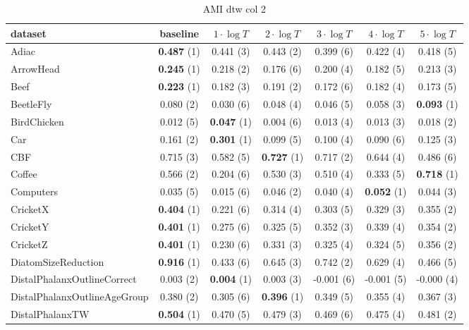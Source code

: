     \begin{table}[ht]
    \caption{AMI dtw col 2} 
    \begin{adjustbox}{width=\textwidth}
    \begin{tabular}{lcccccc}
    \hline
    dataset & baseline & \textbf{$1\cdot \log{T}$} & \textbf{$2\cdot \log{T}$} & \textbf{$3\cdot \log{T}$} & \textbf{$4\cdot \log{T}$} & \textbf{$5\cdot \log{T}$} \\ \hline
    Adiac & \textbf{0.487} (1) & 0.441 (3) & 0.443 (2) & 0.399 (6) & 0.422 (4) & 0.418 (5) \\
    ArrowHead & \textbf{0.245} (1) & 0.218 (2) & 0.176 (6) & 0.200 (4) & 0.182 (5) & 0.213 (3) \\
    Beef & \textbf{0.223} (1) & 0.182 (3) & 0.191 (2) & 0.172 (6) & 0.182 (4) & 0.173 (5) \\
    BeetleFly & 0.080 (2) & 0.030 (6) & 0.048 (4) & 0.046 (5) & 0.058 (3) & \textbf{0.093} (1) \\
    BirdChicken & 0.012 (5) & \textbf{0.047} (1) & 0.004 (6) & 0.013 (4) & 0.013 (3) & 0.018 (2) \\
    Car & 0.161 (2) & \textbf{0.301} (1) & 0.099 (5) & 0.100 (4) & 0.090 (6) & 0.125 (3) \\
    CBF & 0.715 (3) & 0.582 (5) & \textbf{0.727} (1) & 0.717 (2) & 0.644 (4) & 0.486 (6) \\
    Coffee & 0.566 (2) & 0.204 (6) & 0.530 (3) & 0.510 (4) & 0.333 (5) & \textbf{0.718} (1) \\
    Computers & 0.035 (5) & 0.015 (6) & 0.046 (2) & 0.040 (4) & \textbf{0.052} (1) & 0.044 (3) \\
    CricketX & \textbf{0.404} (1) & 0.221 (6) & 0.314 (4) & 0.303 (5) & 0.329 (3) & 0.355 (2) \\
    CricketY & \textbf{0.401} (1) & 0.275 (6) & 0.325 (5) & 0.352 (3) & 0.339 (4) & 0.354 (2) \\
    CricketZ & \textbf{0.401} (1) & 0.230 (6) & 0.331 (3) & 0.325 (4) & 0.324 (5) & 0.356 (2) \\
    DiatomSizeReduction & \textbf{0.916} (1) & 0.433 (6) & 0.645 (3) & 0.742 (2) & 0.629 (4) & 0.466 (5) \\
    DistalPhalanxOutlineCorrect & 0.003 (2) & \textbf{0.004} (1) & 0.003 (3) & -0.001 (6) & -0.001 (5) & -0.000 (4) \\
    DistalPhalanxOutlineAgeGroup & 0.380 (2) & 0.305 (6) & \textbf{0.396} (1) & 0.349 (5) & 0.355 (4) & 0.367 (3) \\
    DistalPhalanxTW & \textbf{0.504} (1) & 0.470 (5) & 0.479 (3) & 0.469 (6) & 0.475 (4) & 0.481 (2) \\

\end{tabular}
\end{adjustbox}
\end{table}
